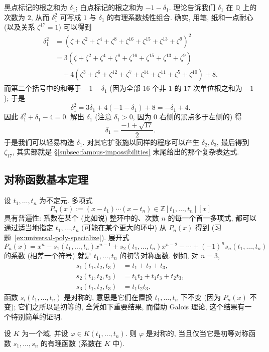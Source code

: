\noindent 黑点标记的根之和为 $\delta_1$; 白点标记的根之和为 $-1-\delta_1$. 理论告诉我们 $\delta_1$ 在 $\mathbb{Q}$ 上的次数为 $2$, 从而 $\delta_1^2$ 可写成 $1$ 与 $\delta_1$ 的有理系数线性组合. 确实, 用笔, 纸和一点耐心 (以及关系 $\zeta^{17}=1$) 可以得到
\[
\begin{aligned}\delta_1^2&=(\zeta+\zeta^2+\zeta^4+\zeta^8+\zeta^{16}+\zeta^{15}+\zeta^{13}+\zeta^9)^2\\
&=3(\zeta+\zeta^2+\zeta^4+\zeta^8+\zeta^{16}+\zeta^{15}+\zeta^{13}+\zeta^9)\\
&\quad+4(\zeta^3+\zeta^6+\zeta^{12}+\zeta^7+\zeta^{14}+\zeta^{11}+\zeta^5+\zeta^{10})+8.
\end{aligned}
\]
而第二个括号中的和等于 $-1-\delta_1$ (因为全部 $16$ 个非 $1$ 的 $17$ 次单位根之和为 $-1$); 于是
\[
\delta_1^2=3\delta_1+4(-1-\delta_1)+8=-\delta_1+4.
\]
因此 $\delta_1^2+\delta_1-4=0$. 解出 $\delta_1$ (注意 $\delta_1>0$, 因为 $0$ 右侧的黑点多于左侧的) 得
\[
\delta_1=\frac{-1+\sqrt{17}}{2}.
\]
于是我们可以轻易构造 $\delta_1$. 对其它扩张施以同样的程序可以产生 $\delta_2,\delta_3$, 最后得到 $\zeta_{17}$, 其实部就是 §\ref{subsec:famous-impossibilities} 末尾给出的那个复杂表达式.

\subsection{对称函数基本定理}
\label{subsec:sym-funcs}

设 $t_1,\ldots,t_n$ 为不定元. 多项式
\[
P_n(x):=(x-t_1)\cdots(x-t_n)\in\mathbb{Z}[t_1,\ldots,t_n][x]
\]
具有普遍性: 系数在某个 (比如说) 整环中的、次数 $n$ 的每一个首一多项式, 都可以通过适当地指定 $t_1,\ldots,t_n$ (可能在某个更大的环中) 从 $P_n(x)$ 得到 (习题~\ref{ex:universal-poly-specialize}). 展开式
\[
P_n(x)=x^n-s_1(t_1,\ldots,t_n)x^{n-1}+s_2(t_1,\ldots,t_n)x^{n-2}-\cdots+(-1)^n s_n(t_1,\ldots,t_n)
\]
的系数 (相差一个符号) 就是 $t_1,\ldots,t_n$ 的初等对称函数. 例如, 对 $n=3$,
\[
\begin{aligned}
s_1(t_1,t_2,t_3)&=t_1+t_2+t_3,\\
s_2(t_1,t_2,t_3)&=t_1t_2+t_1t_3+t_2t_3,\\
s_3(t_1,t_2,t_3)&=t_1t_2t_3.
\end{aligned}
\]
函数 $s_i(t_1,\ldots,t_n)$ 是对称的, 意思是它们在置换 $t_1,\ldots,t_n$ 下不变 (因为 $P_n(x)$ 不变); 它们之所以是初等的, 全凭如下重要结果, 而借助 Galois 理论, 这个结果有一个特别简单的证明.

\begin{theorem}[对称函数基本定理]\label{thm:sym-funcs}
设 $K$ 为一个域, 并设 $\varphi\in K(t_1,\ldots,t_n)$. 则 $\varphi$ 是对称的, 当且仅当它是初等对称函数 $s_1,\ldots,s_n$ 的有理函数 (系数在 $K$ 中).
\end{theorem}

